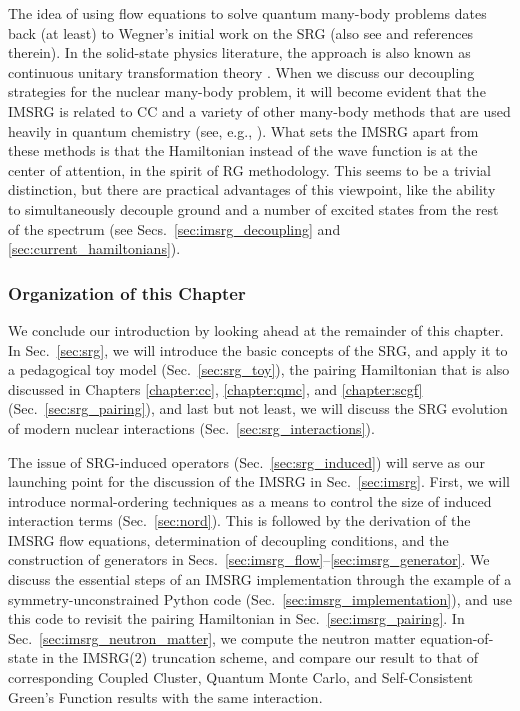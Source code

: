 The idea of using flow equations to solve quantum many-body problems
dates back (at least) to Wegner's initial work on the SRG \cite{Wegner:1994dk} 
(also see \cite{Kehrein:2006kx} and references therein). In the 
solid-state physics literature, the approach is also known as 
continuous unitary transformation theory  
\cite{Heidbrink:2002kx,Drescher:2011kx,Krull:2012bs,Fauseweh:2013zv,Krones:2015ft}.
When we discuss our decoupling strategies for the nuclear many-body
problem, it will become evident that the IMSRG is related to CC 
and a variety of other many-body methods that are used heavily in 
quantum chemistry (see, e.g., \cite{Shavitt:2009,Hagen:2014ve,White:2002fk,
Yanai:2007kx,Nakatsuji:1976yq,Mukherjee:2001uq,Mazziotti:2006fk,Evangelista:2014rq}).
What sets the IMSRG apart from these methods is that the Hamiltonian 
instead of the wave function is at the center of attention, in the
spirit of RG methodology. This seems to be a trivial distinction, but
there are practical advantages of this viewpoint, like the ability to
simultaneously decouple ground and a number of excited states from the
rest of the spectrum (see Secs.~\ref{sec:imsrg_decoupling} and 
\ref{sec:current_hamiltonians}). 


%
%
\subsubsection*{Organization of this Chapter}
We conclude our introduction by looking ahead at the remainder of this
chapter. In Sec.~\ref{sec:srg}, we will introduce the basic concepts of
the SRG, and apply it to a pedagogical toy model
(Sec.~\ref{sec:srg_toy}), the pairing Hamiltonian that is also discussed 
in Chapters \ref{chapter:cc}, \ref{chapter:qmc}, and \ref{chapter:scgf} 
(Sec.~\ref{sec:srg_pairing}), and last but not least, we will discuss the 
SRG evolution of modern nuclear interactions (Sec.~\ref{sec:srg_interactions}). 

The issue of SRG-induced operators (Sec.~\ref{sec:srg_induced}) will serve 
as our launching point for the discussion of the IMSRG in Sec.~\ref{sec:imsrg}.
First, we will introduce normal-ordering techniques as a means to control the 
size of induced interaction terms (Sec.~\ref{sec:nord}). This is followed
by the derivation of the IMSRG flow equations, determination of decoupling
conditions, and the construction of generators in Secs.~\ref{sec:imsrg_flow}--\ref{sec:imsrg_generator}.
We discuss the essential steps of an IMSRG implementation through the 
example of a symmetry-unconstrained Python code (Sec.~\ref{sec:imsrg_implementation}), 
and use this code to revisit the pairing Hamiltonian in Sec.~\ref{sec:imsrg_pairing}.
In Sec.~\ref{sec:imsrg_neutron_matter}, we compute the neutron matter 
equation-of-state in the IMSRG(2) truncation scheme, and compare our result
to that of corresponding Coupled Cluster, Quantum Monte Carlo, and Self-Consistent 
Green's Function results with the same interaction. 

